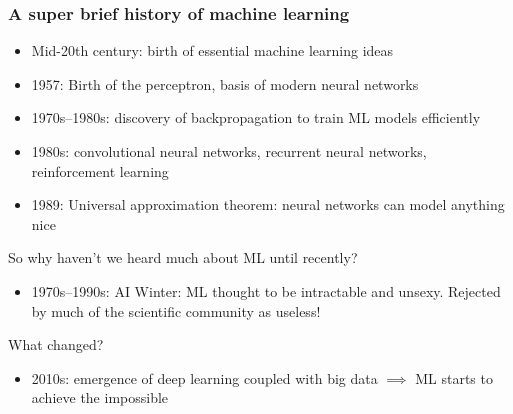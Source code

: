 \begin{frame}
    \frametitle{A super brief history of machine learning}
    \begin{itemize}
        \item Mid-20th century: birth of essential machine learning ideas
        \item 1957: Birth of the \alert{perceptron}, basis of modern neural networks \citep{RosenblattCornell57}
        \item 1970s--1980s: discovery of \alert{backpropagation} to train ML models efficiently \citep{RumelhartNature86}
        \item 1980s: \alert{convolutional} neural networks, \alert{recurrent} neural networks, \alert{reinforcement} learning
        \item 1989: \alert{Universal approximation theorem}: neural networks can model anything nice \citep{CybenkoMCSS89,HornikNN89}
    \end{itemize}
    \pause

    So why haven't we heard much about ML until recently?
    \begin{itemize}
        \item 1970s--1990s: \alert{AI Winter}: ML thought to be intractable and unsexy.
        Rejected by much of the scientific community as useless!
    \end{itemize}
    \pause

    What changed?
    \begin{itemize}
        \item 2010s: emergence of \alert{deep learning} coupled with \alert{big data} $\implies$ ML starts to achieve the impossible
    \end{itemize}
\end{frame}

